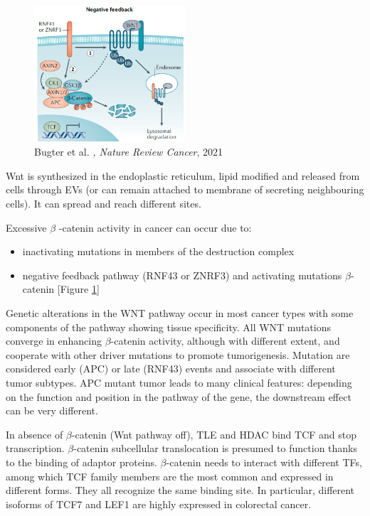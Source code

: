 \begin{figure}
\centering
\includegraphics[width=0.5\textwidth]{../_resources/Screenshot_2022-10-10_at_11-04-14.png}
\caption{Bugter et al. \emph{, Nature Review Cancer}, 2021}
\label{fig:negative}
\end{figure}

Wnt is synthesized in the endoplastic reticulum, lipid modified and released from cells through EVs (or can remain attached to membrane of secreting neighbouring cells). It can spread and reach different sites.

Excessive $\beta$  -catenin activity in cancer can occur due to:

\begin{itemize}
\tightlist
\item
  inactivating mutations in members of the destruction complex
\item
  negative feedback pathway (RNF43 or ZNRF3) and activating mutations $\beta$-catenin [Figure \ref{fig:negative}]
\end{itemize}

Genetic alterations in the WNT pathway occur in most cancer types with some components of the pathway showing tissue specificity. All WNT mutations converge in enhancing $\beta$-catenin activity, although with different extent, and cooperate with other driver mutations to promote tumorigenesis. Mutation are considered early (APC) or late (RNF43) events and associate with different tumor subtypes. APC mutant tumor leads to many clinical features: depending on the function and position in the pathway of the gene, the downstream effect can be very different.

In absence of $\beta$-catenin (Wnt pathway off), TLE and HDAC bind TCF and stop transcription. $\beta$-catenin subcellular translocation is presumed to function thanks to the binding of adaptor proteins. $\beta$-catenin needs to interact with different TFs, among which TCF family members are the most common and expressed in different forms. They all recognize the same binding site. In particular, different isoforms of TCF7 and LEF1 are highly expressed in colorectal cancer.

